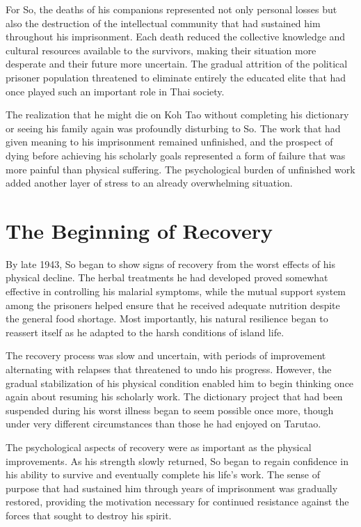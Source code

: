 \documentclass[
  Letterpaper,
]{scrbook}
\begin{document}
For So, the deaths of his companions represented not only personal
losses but also the destruction of the intellectual community that had
sustained him throughout his imprisonment. Each death reduced the
collective knowledge and cultural resources available to the survivors,
making their situation more desperate and their future more uncertain.
The gradual attrition of the political prisoner population threatened to
eliminate entirely the educated elite that had once played such an
important role in Thai society.

The realization that he might die on Koh Tao without completing his
dictionary or seeing his family again was profoundly disturbing to So.
The work that had given meaning to his imprisonment remained unfinished,
and the prospect of dying before achieving his scholarly goals
represented a form of failure that was more painful than physical
suffering. The psychological burden of unfinished work added another
layer of stress to an already overwhelming situation.

\section{The Beginning of Recovery}\label{the-beginning-of-recovery}

By late 1943, So began to show signs of recovery from the worst effects
of his physical decline. The herbal treatments he had developed proved
somewhat effective in controlling his malarial symptoms, while the
mutual support system among the prisoners helped ensure that he received
adequate nutrition despite the general food shortage. Most importantly,
his natural resilience began to reassert itself as he adapted to the
harsh conditions of island life.

The recovery process was slow and uncertain, with periods of improvement
alternating with relapses that threatened to undo his progress. However,
the gradual stabilization of his physical condition enabled him to begin
thinking once again about resuming his scholarly work. The dictionary
project that had been suspended during his worst illness began to seem
possible once more, though under very different circumstances than those
he had enjoyed on Tarutao.

The psychological aspects of recovery were as important as the physical
improvements. As his strength slowly returned, So began to regain
confidence in his ability to survive and eventually complete his life's
work. The sense of purpose that had sustained him through years of
imprisonment was gradually restored, providing the motivation necessary
for continued resistance against the forces that sought to destroy his
spirit.
\end{document}
